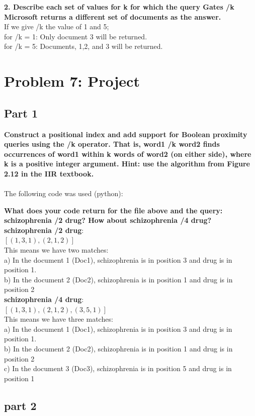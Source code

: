 \documentclass{article}
\begin{document}
\textbf{2. Describe each set of values for k for which the query Gates /k Microsoft returns a different set of documents as the answer.}\\
If we give /k the value of 1 and 5; \\
for /k = 1: Only document 3 will be returned.\\
for /k = 5: Documents, 1,2, and 3 will be returned.


\section{Problem 7: Project}
\subsection{Part 1}
\textbf{Construct a positional index and add support for Boolean proximity queries using the /k operator. That is, word1 /k word2 finds occurrences of word1 within k words of word2 (on either side), where k is a positive integer argument. Hint: use the algorithm from Figure 2.12 in the IIR textbook.}
\\
\\
The following code was used (python):


\textbf{What does your code return for the file above and the query: schizophrenia /2 drug? How about schizophrenia /4 drug?}
\\
\textbf{schizophrenia /2 drug}: \\ $[(1, 3, 1), (2, 1, 2)]$ \\
This means we have two matches: \\
 a) In the document 1 (Doc1), schizophrenia is in position 3 and drug is in position 1. \\
 b) In the document 2 (Doc2), schizophrenia is in position 1 and drug is in position 2
\\
\textbf{schizophrenia /4 drug}: \\ $[(1, 3, 1), (2, 1, 2), (3, 5, 1)]$ \\
This means we have three matches: \\
 a) In the document 1 (Doc1), schizophrenia is in position 3 and drug is in position 1. \\
 b) In the document 2 (Doc2), schizophrenia is in position 1 and drug is in position 2 \\
 c) In the document 3 (Doc3), schizophrenia is in position 5 and drug is in position 1

\subsection{part 2}
\end{document}
